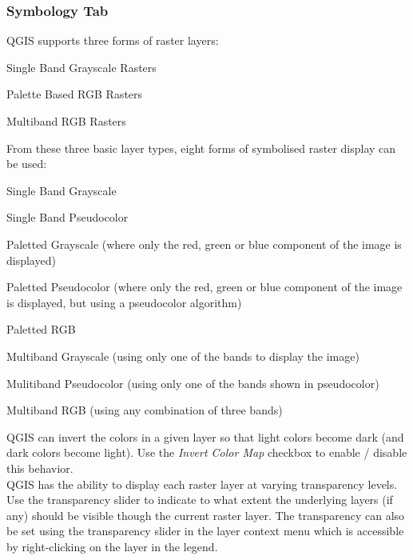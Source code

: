 \documentclass[10pt,english]{article}
\begin{document}
\begin{onehalfspace}
\subsubsection{Symbology Tab}


QGIS supports three forms of raster layers:
\begin{compactitem}
\item Single Band Grayscale Rasters
\item Palette Based RGB Rasters
\item Multiband RGB Rasters
\end{compactitem}

From these three basic layer types, eight forms of symbolised raster display can
be used:
\begin{compactenum}

\item Single Band Grayscale
\item Single Band Pseudocolor
\item Paletted Grayscale (where only the red, green or blue component of the image is displayed)
\item Paletted Pseudocolor (where only the red, green or blue component of the image is displayed, but using a pseudocolor algorithm)
\item Paletted RGB
\item Multiband Grayscale (using only one of the bands to display the image)
\item Mulitiband Pseudocolor (using only one of the bands shown in pseudocolor)
\item Multiband RGB (using any combination of three bands)
\end{compactenum}
\smallskip
QGIS can invert the colors in a given layer so that light colors become dark
(and dark colors become light). Use the \textsl{Invert Color Map} checkbox to
enable / disable this behavior.\\

QGIS has the ability to display each raster layer at varying transparency
levels. Use the transparency slider to indicate to what extent the underlying layers (if any) should be visible though the current raster layer. The transparency can also be set using the transparency slider in the layer context menu which is accessible by right-clicking on the layer in the legend.\\


\end{onehalfspace}
\end{document}
